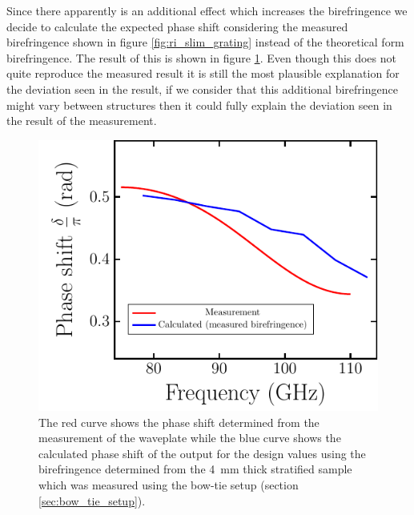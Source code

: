 \newpage

Since there apparently is an additional effect which increases the birefringence we decide to calculate the expected phase shift considering the measured birefringence shown in figure \ref{fig:ri_slim_grating} instead of the theoretical form birefringence. The result of this is shown in figure \ref{fig:delta_gratings_bf}. Even though this does not quite reproduce the measured result it is still the most plausible explanation for the deviation seen in the result, if we consider that this additional birefringence might vary between structures then it could fully explain the deviation seen in the result of the measurement.

\begin{figure}[H]
    \centering
    \includegraphics[scale=.55]{images/results/plots/polymer/delta_gratings_bf.pdf}
    \caption{The red curve shows the phase shift determined from the measurement of the waveplate while the blue curve shows the calculated phase shift of the output for the design values using the birefringence determined from the \SI{4}{\milli \meter} thick stratified sample which was measured using the bow-tie setup (section \ref{sec:bow_tie_setup}).}
    \label{fig:delta_gratings_bf}
\end{figure}

